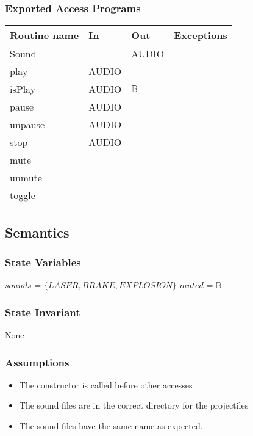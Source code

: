 \documentclass[12pt]{article}
\begin{document}
\subsubsection*{Exported Access Programs}

\begin{tabular}{| l | l | l | l |}
    \hline
    \textbf{Routine name} & \textbf{In} & \textbf{Out} & \textbf{Exceptions}\\
    \hline
    Sound & ~ & AUDIO & ~\\
    \hline
    play & AUDIO & ~ & ~\\
    \hline
    isPlay & AUDIO & $\mathbb{B}$ & ~\\
    \hline
    pause & AUDIO & ~ & ~\\
    \hline
    unpause & AUDIO & ~ & ~\\
    \hline
    stop & AUDIO & ~ & ~\\
    \hline
    mute & ~ & ~ & ~\\
    \hline
    unmute & ~ & ~ & ~\\
    \hline
    toggle & ~ & ~ & ~\\
    \hline
\end{tabular}

\subsection* {Semantics}

\subsubsection* {State Variables}

$sounds$ = $\{LASER,BRAKE,EXPLOSION\}$
$muted$ = $\mathbb{B}$

\subsubsection* {State Invariant}

None

\subsubsection* {Assumptions}

\begin{itemize}
    \item The constructor is called before other accesses
    \item The sound files are in the correct directory for the projectiles
    \item The sound files have the same name as expected.
\end{itemize}
\end{document}
